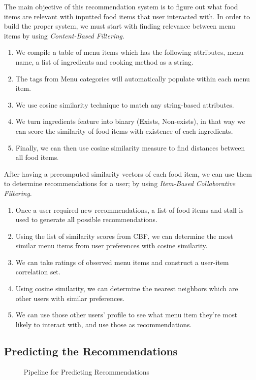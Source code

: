 The main objective of this recommendation system is to figure out what food items are relevant with inputted food items that user interacted with.
In order to build the proper system, we must start with finding relevance between menu items by using \textit{Content-Based Filtering}.

\begin{enumerate}[leftmargin=80pt]
    \item We compile a table of menu items which has the following attributes, menu name, a list of ingredients and cooking method as a string.
    \item The tags from Menu categories will automatically populate within each menu item.
    \item We use cosine similarity technique to match any string-based attributes.
    \item We turn ingredients feature into binary (Exists, Non-exists), in that way we can score the similarity of food items with existence of each ingredients.
    \item Finally, we can then use cosine similarity measure to find distances between all food items.
\end{enumerate}

After having a precomputed similarity vectors of each food item, we can use them to determine recommendations for a user;
by using \textit{Item-Based Collaborative Filtering}.

\begin{enumerate}[leftmargin=80pt]
    \item Once a user required new recommendations, a list of food items and stall is used to generate all possible recommendations.
    \item Using the list of similarity scores from CBF, we can determine the most similar menu items from user preferences with cosine similarity.
    \item We can take ratings of observed menu items and construct a user-item correlation set.
    \item Using cosine similarity, we can determine the nearest neighbors which are other users with similar preferences.
    \item We can use those other users' profile to see what menu item they're most likely to interact with, and use those as recommendations.
\end{enumerate}

\subsection{Predicting the Recommendations}
\begin{figure}[h!]
    \centering
    
    \caption{Pipeline for Predicting Recommendations}
    \label{fig:pipeline-for-predicting}
\end{figure}

